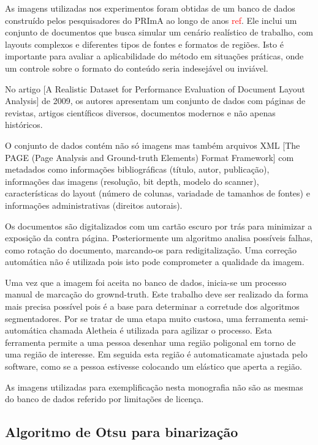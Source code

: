 \documentclass[a4paper,11pt]{article}
\newcommand{\TODO}[1]{\textcolor{red}{#1}}
\begin{document}
    As imagens utilizadas nos experimentos foram obtidas de um banco de dados construído pelos pesquisadores do PRImA ao longo de anos \TODO{ref}. Ele inclui um conjunto de documentos que busca simular um cenário realístico de trabalho, com layouts complexos e diferentes tipos de fontes e formatos de regiões. Isto é importante para avaliar a aplicabilidade do método em situações práticas, onde um controle sobre o formato do conteúdo seria indesejável ou inviável.

    No artigo [A Realistic Dataset for Performance Evaluation of Document Layout Analysis] de 2009, os autores apresentam um conjunto de dados com páginas de revistas, artigos científicos diversos, documentos modernos e não apenas históricos.

    O conjunto de dados contém não só imagens mas também arquivos XML [The PAGE (Page Analysis and Ground-truth Elements) Format Framework] com metadados como informações bibliográficas (título, autor, publicação), informações das imagens (resolução, bit depth, modelo do scanner), características do layout (número de colunas, variadade de tamanhos de fontes) e informações administrativas (direitos autorais).

    Os documentos são digitalizados com um cartão escuro por trás para minimizar a exposição da contra página. Posteriormente um algoritmo analisa possíveis falhas, como rotação do documento, marcando-os para redigitalização. Uma correção automática não é utilizada pois isto pode comprometer a qualidade da imagem.

    Uma vez que a imagem foi aceita no banco de dados, inicia-se um processo manual de marcação do grownd-truth. Este trabalho deve ser realizado da forma mais precisa possível pois é a base para determinar a corretude dos algoritmos segmentadores. Por se tratar de uma etapa muito custosa, uma ferramenta semi-automática chamada Aletheia é utilizada para agilizar o processo. Esta ferramenta permite a uma pessoa desenhar uma região poligonal em torno de uma região de interesse. Em seguida esta região é automaticamate ajustada pelo software, como se a pessoa estivesse colocando um elástico que aperta a região.

    As imagens utilizadas para exemplificação nesta monografia não são as mesmas do banco de dados referido por limitações de licença.

  \subsection{Algoritmo de Otsu para binarização}
\end{document}
